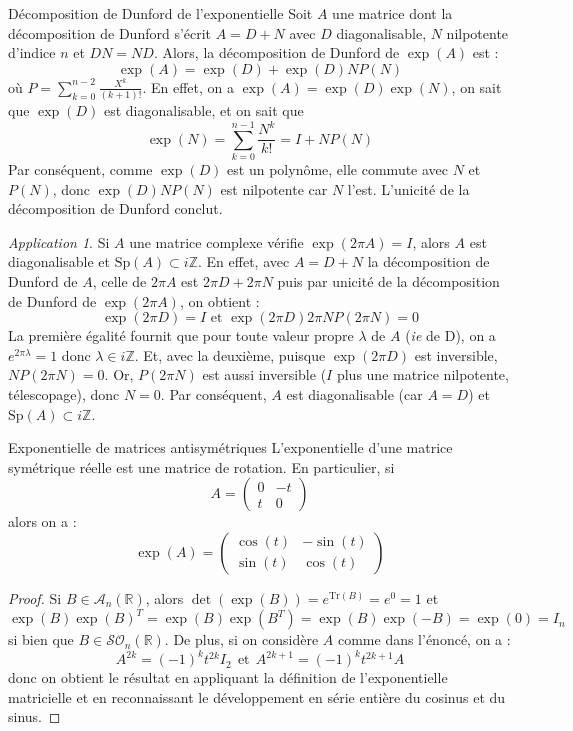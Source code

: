 \documentclass[french]{book}
\newcommand{\Z}{\mathbb{Z}}
\newcommand{\R}{\mathbb{R}}
\newcommand{\Tr}{\text{Tr}}
\theoremstyle{plain}
\theoremstyle{definition}
\theoremstyle{remark}
\newtheorem*{app}{Application}
\begin{document}
\begin{AS}{Décomposition de Dunford de l'exponentielle} Soit $A$ une matrice dont la décomposition de Dunford s'écrit $A=D+N$ avec $D$ diagonalisable, $N$ nilpotente d'indice $n$ et $DN=ND$. Alors, la décomposition de Dunford de $\exp(A)$ est : $$\exp(A)=\exp(D)+\exp(D)NP(N)$$ où $P=\displaystyle\sum_{k=0}^{n-2}\frac{X^k}{(k+1)!}$. En effet, on a $\exp(A)=\exp(D)\exp(N)$, on sait que $\exp(D)$ est diagonalisable, et on sait que $$\exp(N)=\sum_{k=0}^{n-1}\frac{N^k}{k!}=I+NP(N)$$ Par conséquent, comme $\exp(D)$ est un polynôme, elle commute avec $N$ et $P(N)$, donc $\exp(D)NP(N)$ est nilpotente car $N$ l'est. L'unicité de la décomposition de Dunford conclut.
\end{AS}
\begin{app}
	Si $A$ une matrice complexe vérifie $\exp(2\pi A)=I$, alors $A$ est diagonalisable et $\text{Sp}(A)\subset i\Z$. En effet, avec $A=D+N$ la décomposition de Dunford de $A$, celle de $2\pi A$ est $2\pi D+2\pi N$ puis par unicité de la décomposition de Dunford de $\exp(2\pi A)$, on obtient : $$\exp(2\pi D)=I\text{  et  }\exp(2\pi D)2\pi NP(2\pi N)=0$$ La première égalité fournit que pour toute valeur propre $\lambda$ de $A$ (\textit{ie} de D), on a $e^{2\pi\lambda}=1$ donc $\lambda\in i\Z$. Et, avec la deuxième, puisque $\exp(2\pi D)$ est inversible, $NP(2\pi N)=0$. Or, $P(2\pi N)$ est aussi inversible ($I$ plus une matrice nilpotente, télescopage), donc $N=0$. Par conséquent, $A$ est diagonalisable (car $A=D$) et $\text{Sp}(A)\subset i\Z$.
\end{app}
\begin{AS}{Exponentielle de matrices antisymétriques} L'exponentielle d'une matrice symétrique réelle est une matrice de rotation. En particulier, si $$A=\begin{pmatrix}
	0&-t\\
	t&0
\end{pmatrix}$$ alors on a : $$\exp(A)=\begin{pmatrix}
\cos(t)&-\sin(t)\\
\sin(t)&\cos(t)
\end{pmatrix}$$
\end{AS}
\begin{proof}
	Si $B\in\mathcal{A}_n(\R)$, alors $\det(\exp(B))=e^{\Tr(B)}=e^0=1$ et $$\exp(B)\exp(B)^T=\exp(B)\exp(B^T)=\exp(B)\exp(-B)=\exp(0)=I_n$$ si bien que $B\in\mathcal{SO}_n(\R)$. De plus, si on considère $A$ comme dans l'énoncé, on a : $$A^{2k}=(-1)^kt^{2k}I_2 \ \ \text{et} \ \ A^{2k+1}=(-1)^kt^{2k+1}A$$ donc on obtient le résultat en appliquant la définition de l'exponentielle matricielle et en reconnaissant le développement en série entière du cosinus et du sinus. 
\end{proof}
\end{document}
